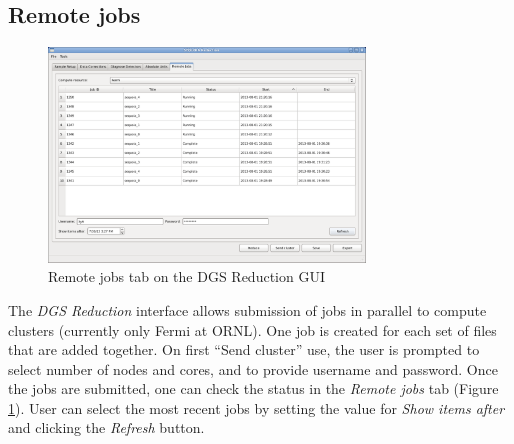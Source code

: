 \subsection{Remote jobs}

\begin{figure}[ht]
\centerline{\includegraphics[width=0.75\textwidth]{figures/cluster.png}}
\caption{Remote jobs tab on the DGS Reduction GUI}
\label{fig:cluster}
\end{figure}

The \textit{DGS Reduction} interface allows submission of jobs in parallel to compute clusters (currently only Fermi at ORNL). One job is created for each set of files that are added together. On first ``Send cluster'' use, the user is prompted to select number of nodes and cores, and to provide username and password. Once the jobs are submitted, one can check the status in the \textit{Remote jobs} tab (Figure \ref{fig:cluster}). User can select the most recent jobs by setting the value for \textit{Show items after} and clicking the \textit{Refresh} button. 

